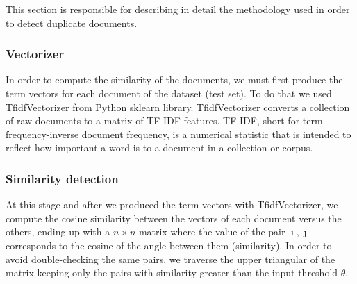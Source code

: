 This section is responsible for describing in detail the methodology used in order to detect duplicate documents.
\subsubsection{Vectorizer}
In order to compute the similarity of the documents, we must first  produce the term vectors for each document of the dataset (test set). To do that we used TfidfVectorizer from Python sklearn library. TfidfVectorizer converts a collection of raw documents to a matrix of TF-IDF features. TF-IDF, short for term frequency-inverse document frequency, is a numerical statistic that is intended to reflect how important a word is to a document in a collection or corpus. \cite{rajaraman2011datamining}
\subsubsection{Similarity detection}
At this stage and after we produced the term vectors with TfidfVectorizer, we compute the cosine similarity between the  vectors of each document versus the others, ending up with a $n \times n$  matrix where the value of the pair $\imath, \jmath$ corresponds to the cosine of the angle between them (similarity). In order to avoid double-checking the same pairs, we traverse the upper triangular of the matrix keeping only the pairs with similarity greater than the input threshold $\theta$. 
